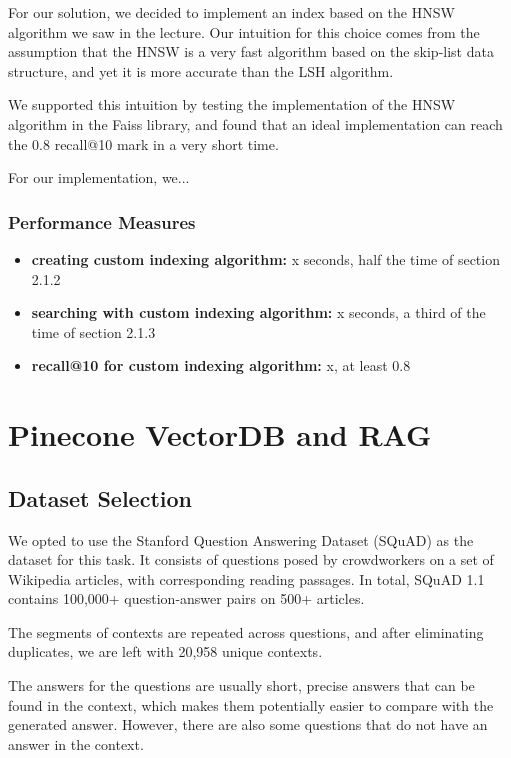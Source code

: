 \documentclass[12pt]{article}
\begin{document}
For our solution, we decided to implement an index based on the HNSW algorithm we saw in the lecture. 
Our intuition for this choice comes from the assumption that the HNSW is a very fast algorithm based on the skip-list data structure, and yet it is more accurate than the LSH algorithm.

We supported this intuition by testing the implementation of the HNSW algorithm in the Faiss library, and found that an ideal implementation can reach the 0.8 recall@10 mark in a very short time.

For our implementation, we...

\subsubsection*{Performance Measures}

\begin{itemize}
    \item \textbf{creating custom indexing algorithm:} x seconds, half the time of section 2.1.2
    \item \textbf{searching with custom indexing algorithm:} x seconds, a third of the time of section 2.1.3
    \item \textbf{recall@10 for custom indexing algorithm:} x, at least 0.8
\end{itemize}



\newpage

\section{Pinecone VectorDB and RAG}

\subsection{Dataset Selection}

We opted to use the Stanford Question Answering Dataset (SQuAD) as the dataset for this task. 
It consists of questions posed by crowdworkers on a set of Wikipedia articles, with corresponding reading passages.
In total, SQuAD 1.1 contains 100,000+ question-answer pairs on 500+ articles.

The segments of contexts are repeated across questions, and after eliminating duplicates, we are left with 20,958 unique contexts.

The answers for the questions are usually short, precise answers that can be found in the context, which makes them potentially easier to compare with the generated answer. However, there are also some questions that do not have an answer in the context.
\end{document}
